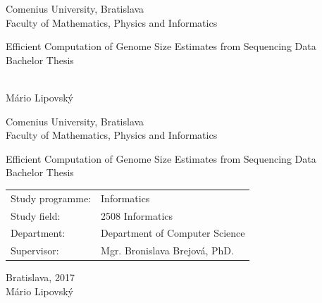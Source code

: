 \documentclass[12pt, oneside]{book}
\def\mfrok{2017}
\def\mfnazov{Efficient Computation of Genome Size Estimates from Sequencing Data}
\def\mftyp{Bachelor Thesis}
\def\mfautor{Mário Lipovský}
\def\mfskolitel{Mgr. Bronislava Brejová, PhD.}
\def\mfkonzultant{tit. Meno Priezvisko, tit. }
\def\mfmiesto{Bratislava, \mfrok}
\def\mfodbor{2508 Informatics}
\def\program{Informatics}
\def\mfpracovisko{Department of Computer Science}
\begin{document}

\frontmatter


\thispagestyle{empty}

\begin{center}
\sc\large
Comenius University, Bratislava\\
Faculty of Mathematics, Physics and Informatics

\vfill

{\LARGE\mfnazov}\\
\mftyp
\end{center}

\vfill

{\sc\large 
\noindent \mfrok\\
\mfautor
}

\eject %


\thispagestyle{empty}
\noindent

\begin{center}
\sc  
\large
Comenius University, Bratislava\\
Faculty of Mathematics, Physics and Informatics

\vfill

{\LARGE\mfnazov}\\
\mftyp
\end{center}

\vfill

\noindent
\begin{tabular}{ll}
Study programme: & \program \\
Study field: & \mfodbor \\
Department: & \mfpracovisko \\
Supervisor: & \mfskolitel \\
\end{tabular}

\vfill


\noindent \mfmiesto\\
\mfautor

\eject %




\end{document}
